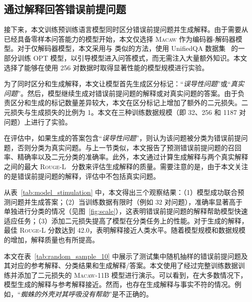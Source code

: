 \subsection{通过解释回答错误前提问题}
\label{exp:answerfpq}
接下来，本文训练预训练语言模型同时区分错误前提问题并生成解释。由于需要从已经具备零样本问答能力的模型开始，本文仅选择 \textsc{Macaw} 作为编码器-解码器模型。对于仅解码器模型，本文采用与 \citet{tafjord2021general} 类似的方法，使用 UnifiedQA 数据集~\cite{khashabi-etal-2020-unifiedqa} 的一部分训练 OPT 模型，以引导模型进入问答模式，而无需注入大量额外知识。本文选择了能够在使用 256 对数据时取得显著性能的模型规模进行实验。

为了同时区分和生成解释，本文让模型首先生成区分标记：“\textit{误导性问题}”或“\textit{真实问题}”。然后，模型继续生成对错误前提问题的解释或对真实问题的答案。由于负责区分和生成的标记数量差异较大，本文在区分标记上增加了额外的二元损失。二元损失与生成损失的比例为 1。本文在三种训练数据规模（即 32、256 和 1187 对问题）上进行了实验。

在评估中，如果生成的答案包含“\textit{误导性问题}”，则认为该问题被分类为错误前提问题，否则分类为真实问题。与上一节类似，本文报告了预测错误前提问题的召回率、精确率以及二元分类的准确率。此外，本文通过计算生成解释与两个真实解释之间的最大 \textsc{Rouge}-L~\cite{lin2004rouge} 分数来评估生成解释的质量。需要注意的是，由于本文关注的是错误前提问题的解释，评估中不包括真实问题。

从表~\ref{tab:model_stimulation} 中，本文得出三个观察结果：（1）模型成功联合预测问题并生成答案；（2）当训练数据有限时（例如 32 对问题），准确率显著高于单独进行分类的情况（见图~\ref{fig:scale}），这表明错误前提问题的解释帮助模型快速适应任务；（3）添加二元损失提高了模型在分类任务上的性能。对于生成的解释，最佳 \textsc{Rouge}-L 分数达到 42.0，表明解释接近人类水平。随着模型规模和数据规模的增加，解释质量也有所提高。

本文在表~\ref{tab:random_sample_10} 中展示了测试集中随机抽样的错误前提问题及其对应的参考解释、分类结果和生成解释/答案。本文使用了经过完整训练数据训练并添加了二元损失的 \textsc{Macaw-11B} 模型进行演示。可以看到，在大多数情况下，模型生成的解释与参考解释接近。然而，也存在生成解释与事实不符的情况。例如，“\textit{蜘蛛的外壳对其呼吸没有帮助}”是不正确的。

